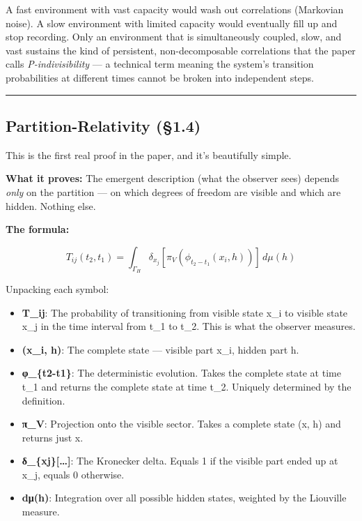 \documentclass[
]{article}
\providecommand{\tightlist}{%
  \setlength{\itemsep}{0pt}\setlength{\parskip}{0pt}}
\begin{document}
A fast environment with vast capacity would wash out correlations
(Markovian noise). A slow environment with limited capacity would
eventually fill up and stop recording. Only an environment that is
simultaneously coupled, slow, and vast sustains the kind of persistent,
non-decomposable correlations that the paper calls
\emph{P-indivisibility} --- a technical term meaning the system's
transition probabilities at different times cannot be broken into
independent steps.

\begin{center}\rule{0.5\linewidth}{0.5pt}\end{center}

\hypertarget{partition-relativity-1.4}{%
\subsection{Partition-Relativity
(§1.4)}\label{partition-relativity-1.4}}

This is the first real proof in the paper, and it's beautifully simple.

\textbf{What it proves:} The emergent description (what the observer
sees) depends \emph{only} on the partition --- on which degrees of
freedom are visible and which are hidden. Nothing else.

\textbf{The formula:}

\[T_{ij}(t_2, t_1) = \int_{\Gamma_H} \delta_{x_j}[\pi_V(\phi_{t_2-t_1}(x_i, h))] \, d\mu(h)\]

Unpacking each symbol:

\begin{itemize}
\tightlist
\item
  \textbf{T\_ij}: The probability of transitioning from visible state
  x\_i to visible state x\_j in the time interval from t\_1 to t\_2.
  This is what the observer measures.
\item
  \textbf{(x\_i, h)}: The complete state --- visible part x\_i, hidden
  part h.
\item
  \textbf{φ\_\{t2-t1\}}: The deterministic evolution. Takes the complete
  state at time t\_1 and returns the complete state at time t\_2.
  Uniquely determined by the definition.
\item
  \textbf{π\_V}: Projection onto the visible sector. Takes a complete
  state (x, h) and returns just x.
\item
  \textbf{δ\_\{xj\}{[}\ldots{]}}: The Kronecker delta. Equals 1 if the
  visible part ended up at x\_j, equals 0 otherwise.
\item
  \textbf{dμ(h)}: Integration over all possible hidden states, weighted
  by the Liouville measure.
\end{itemize}
\end{document}
